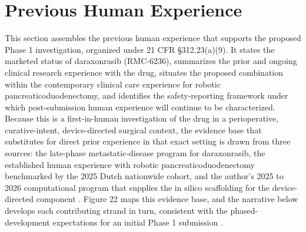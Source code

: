 \section{Previous Human Experience}

This section assembles the previous human experience that supports the proposed
Phase 1 investigation, organized under 21 CFR \S 312.23(a)(9). It states the
marketed status of daraxonrasib (RMC-6236), summarizes the prior and ongoing
clinical research experience with the drug, situates the proposed combination
within the contemporary clinical care experience for robotic
pancreaticoduodenectomy, and identifies the safety-reporting framework under
which post-submission human experience will continue to be characterized. Because
this is a first-in-human investigation of the drug in a perioperative,
curative-intent, device-directed surgical context, the evidence base that
substitutes for direct prior experience in that exact setting is drawn from three
sources: the late-phase metastatic-disease program for daraxonrasib, the
established human experience with robotic pancreaticoduodenectomy benchmarked by
the 2025 Dutch nationwide cohort, and the author's 2025 to 2026 computational
program that supplies the in silico scaffolding for the device-directed component
\cite{daraxwhipple, onpremwhippl}. Figure 22 maps this evidence base, and the
narrative below develops each contributing strand in turn, consistent with the
phased-development expectations for an initial Phase 1 submission
\cite{phase1guidance}.

